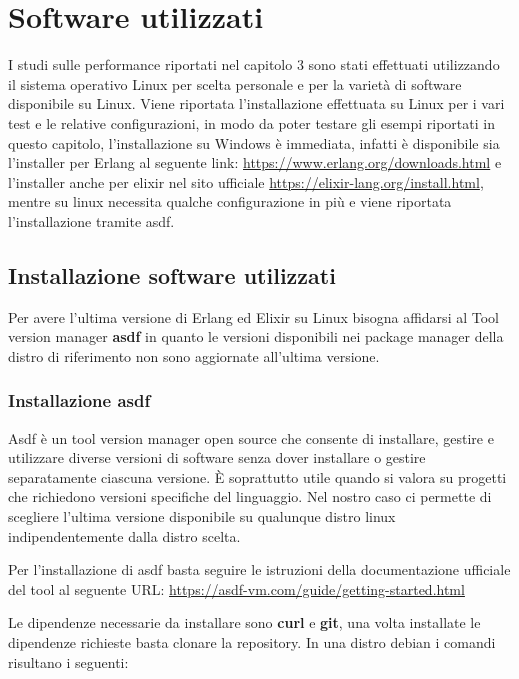 \section{Software utilizzati}

I studi sulle performance riportati nel capitolo 3
sono stati effettuati
utilizzando il sistema operativo Linux per scelta personale e
per la varietà di software disponibile su Linux.
Viene riportata l'installazione effettuata su Linux per i vari test e le
relative configurazioni, in modo da poter testare gli esempi
riportati in questo capitolo, l'installazione su Windows è immediata,
infatti è disponibile sia l'installer per Erlang al seguente link: \url{https://www.erlang.org/downloads.html}
e l'installer anche per elixir nel sito ufficiale \url{https://elixir-lang.org/install.html},
mentre su linux necessita qualche configurazione in più e viene riportata
l'installazione tramite asdf.

\subsection{Installazione software utilizzati} 

Per avere l'ultima versione di Erlang ed Elixir su Linux bisogna affidarsi
al Tool version manager \textbf{asdf} in quanto le versioni disponibili nei
package manager della distro di riferimento non sono aggiornate all'ultima
versione.

\subsubsection{Installazione asdf}

Asdf è un tool version manager open source che consente di installare,
gestire e utilizzare diverse versioni di software senza dover
installare o gestire separatamente ciascuna versione. È soprattutto
utile quando si valora su progetti che richiedono versioni specifiche
del linguaggio. Nel nostro caso ci permette di scegliere l'ultima
versione disponibile su qualunque distro linux indipendentemente
dalla distro scelta.

Per l'installazione di asdf basta seguire le istruzioni della
documentazione ufficiale del tool al seguente URL: \url{https://asdf-vm.com/guide/getting-started.html}

Le dipendenze necessarie da installare sono \textbf{curl} e \textbf{git},
una volta installate le dipendenze richieste basta clonare la repository.
In una distro debian i comandi risultano i seguenti:


